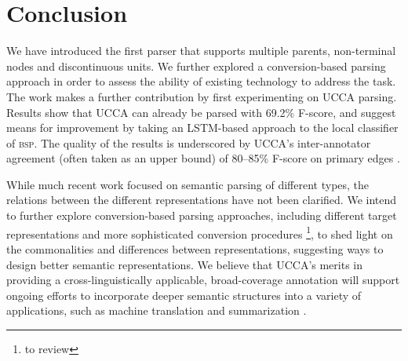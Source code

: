 \documentclass[11pt]{article}
\newcommand{\daniel}[1]{\footnote{\color{blue} #1}}
\begin{document}
\section{Conclusion}\label{sec:conclusion}

We have introduced the first parser that supports multiple parents, non-terminal
nodes and discontinuous units.
We further explored a conversion-based parsing approach in order to assess the ability of existing
technology to address the task.
The work makes a further contribution by first experimenting on UCCA parsing.
Results show that UCCA can already be parsed with 69.2\% F-score,
and suggest means for improvement by taking an LSTM-based
approach to the local classifier of \textsc{bsp}.
The quality of the results is underscored by UCCA's inter-annotator
agreement (often taken as an upper bound) of 
80--85\% F-score on primary edges \cite{abend2013universal}.




While much recent work focused on semantic parsing of different types,
the relations between the different representations have not been clarified.
We intend to further explore conversion-based parsing approaches,
including different target representations and more sophisticated conversion procedures \cite{kong-15}\daniel{to review},
to shed light on the commonalities and differences between representations, suggesting ways to
design better semantic representations.
We believe that UCCA's merits in providing a cross-linguistically applicable, broad-coverage
annotation will support ongoing efforts to incorporate deeper semantic structures
into a variety of applications, such as machine translation \cite{jones2012semantics}
and summarization \cite{liu2015toward}.
\end{document}
